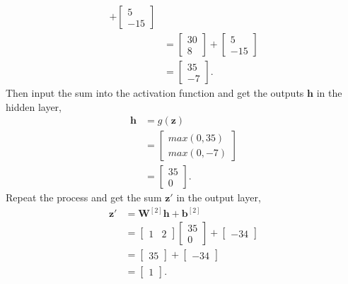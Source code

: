 \documentclass[10pt]{article}
\begin{document}
\begin{enumerate}[1)]
\begin{align*}
+
  \begin{bmatrix}
    5\\
    -15
  \end{bmatrix}\\
&=
  \begin{bmatrix}
    30\\
    8
  \end{bmatrix}
+
  \begin{bmatrix}
    5\\
    -15
  \end{bmatrix}\\
&=
  \begin{bmatrix}
    35\\
    -7
  \end{bmatrix}.
\end{align*}
Then input the sum into the activation function and get the outputs $\pmb{h}$ in the hidden layer,
\begin{align*}
\pmb{h}&=g(\pmb{z})\\
&=
  \begin{bmatrix}
    max(0,35)\\
    max(0,-7)
  \end{bmatrix}\\
&=
  \begin{bmatrix}
    35\\
    0
  \end{bmatrix}.
\end{align*}
Repeat the process and get the sum $\pmb{z}'$ in the output layer,
\begin{align*}
\pmb{z}'&=\pmb{W}^{[2]}\pmb{h}+\pmb{b}^{[2]}\\
&=
  \begin{bmatrix}
    1 & 2
  \end{bmatrix}
  \begin{bmatrix}
    35\\
    0
  \end{bmatrix}
+
  \begin{bmatrix}
    -34
  \end{bmatrix}\\
&=
  \begin{bmatrix}
    35
  \end{bmatrix}
+
  \begin{bmatrix}
    -34
  \end{bmatrix}\\
&=
  \begin{bmatrix}
    1
  \end{bmatrix}.
\end{align*}

\end{enumerate}
\end{document}
